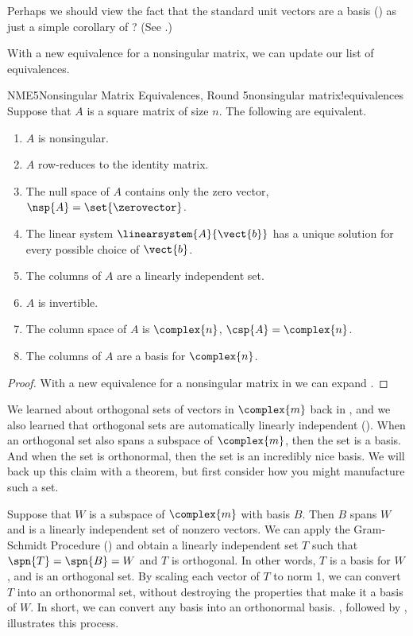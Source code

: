 %
Perhaps we should view the fact that the standard unit vectors are a basis () as just a simple corollary of ?  (See .)\par
%
With a new equivalence for a nonsingular matrix, we can update our list of equivalences.
%
\begin{theorem}{NME5}{Nonsingular Matrix Equivalences, Round 5}{nonsingular matrix!equivalences}
Suppose that $A$ is a square matrix of size $n$.  The following are equivalent.
%
\begin{enumerate}
\item $A$ is nonsingular.
\item $A$ row-reduces to the identity matrix.
\item The null space of $A$ contains only the zero vector, $\nsp{A}=\set{\zerovector}$.
\item The linear system $\linearsystem{A}{\vect{b}}$ has a unique solution for every possible choice of $\vect{b}$.
\item The columns of $A$ are a linearly independent set.
\item $A$ is invertible.
\item The column space of $A$ is $\complex{n}$, $\csp{A}=\complex{n}$.
\item The columns of $A$ are a basis for $\complex{n}$.
\end{enumerate}
\end{theorem}
%
\begin{proof}
With a new equivalence for a nonsingular matrix in  we can expand .
\end{proof}
%
%
We learned about orthogonal sets of vectors in $\complex{m}$ back in , and we also learned that orthogonal sets are automatically linearly independent ().  When an orthogonal set also spans a subspace of $\complex{m}$, then the set is a basis.  And when the set is orthonormal, then the set is an incredibly nice basis.  We will back up this claim with a theorem, but first consider how you might manufacture such a set.\par
%
Suppose that $W$ is a subspace of $\complex{m}$ with basis $B$.  Then $B$ spans $W$ and is a linearly independent set of nonzero vectors.  We can apply the Gram-Schmidt Procedure () and obtain a linearly independent set $T$ such that $\spn{T}=\spn{B}=W$ and $T$ is orthogonal.  In other words, $T$ is a basis for $W$, and is an orthogonal set.  By scaling each vector of $T$ to norm 1, we can convert $T$ into an orthonormal set, without destroying the properties that make it a basis of $W$.  In short, we can convert any basis into an orthonormal basis.  , followed by , illustrates this process.\par
